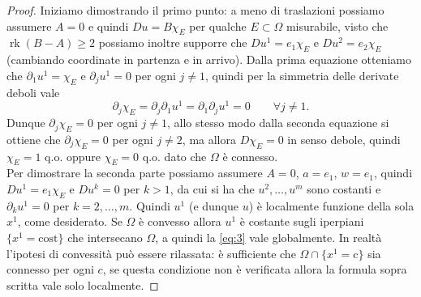 \documentclass[a4paper,11pt]{book}
\theoremstyle{plain}
\theoremstyle{definition}
\theoremstyle{remark}
\DeclareMathOperator{\rk}{rk}
\begin{document}
\begin{proof}
	Iniziamo dimostrando il primo punto: a meno di traslazioni possiamo assumere $A=0$ e quindi $Du = B\chi_{E}$ per qualche $E\subset \Omega$ misurabile, visto che $\rk(B-A)\geq 2$ possiamo inoltre supporre che $Du^1 = e_1\chi_E$ e $Du^2 = e_2\chi_E$ (cambiando coordinate in partenza e in arrivo). Dalla prima equazione otteniamo che $\partial_{1}u^{1}=\chi_E$ e $\partial_{j}u^{1}=0$ per ogni $j\neq1$, quindi per la simmetria delle derivate deboli vale
	\[
		\partial_{j}\chi_E=\partial_{j}\partial_{1}u^{1}=\partial_{1}\partial_{j}u^{1}=0\qquad \forall j\neq 1.
	\]
	Dunque $\partial_{j}\chi_E=0$ per ogni $j\neq1$, allo stesso modo dalla seconda equazione si ottiene che $\partial_{j}\chi_E=0$ per ogni $j\neq 2$, ma allora $D\chi_E = 0$ in senso debole, quindi $\chi_E = 1$ q.o. oppure $\chi_E = 0$ q.o. dato che $\Omega$ è connesso.\\
	Per dimostrare la seconda parte possiamo assumere $A=0$, $a=e_1$, $w=e_1$, quindi $Du^1 = e_1\chi_E$ e $Du^k=0$ per $k > 1$, da cui si ha che $u^2,\ldots,u^m$ sono costanti e $\partial_k u^1 = 0$ per $k=2,\ldots,m$. Quindi $u^1$ (e dunque $u$) è localmente funzione della sola $x^1$, come desiderato. Se $\Omega$ è convesso allora $u^1$ è costante sugli iperpiani $\{x^1=\text{cost}\}$ che intersecano $\Omega$, a quindi la \eqref{eq:3} vale globalmente. In realtà l'ipotesi di convessità può essere rilassata: è sufficiente che $\Omega\cap \{x^1=\text{c}\}$ sia connesso per ogni $c$, se questa condizione non è verificata allora la formula sopra scritta vale solo localmente.
\end{proof}

\end{document}
